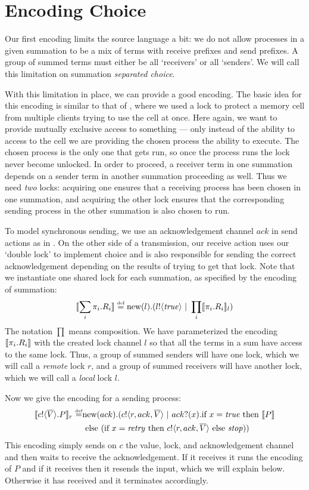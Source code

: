 \section{Encoding Choice}\label{failedencoding}
Our first encoding limits the source language a bit: we do not allow processes in a given summation to be a mix of terms with receive prefixes and send prefixes.  
A group of summed terms must either be all `receivers' or all `senders'.  
We will call this limitation on summation \emph{separated choice}.

With this limitation in place, we can provide a good encoding.  
The basic idea for this encoding is similar to that of , where we used a lock to protect a memory cell from multiple clients trying to use the cell at once.  
Here again, we want to provide mutually exclusive access to something --- only instead of the ability to access to the cell we are providing the chosen process the ability to execute.  
The chosen process is the only one that gets run, so once the process runs the lock never become unlocked.  
In order to proceed, a receiver term in one summation depends on a sender term in another summation proceeding as well.
Thus we need \emph{two} locks: acquiring one ensures that a receiving process has been chosen in one summation, and acquiring the other lock ensures that the corresponding sending process in the other summation is also chosen to run.

To model synchronous sending, we use an acknowledgement channel $ack$ in send actions as in .  On the other side of a transmission, our receive action uses our `double lock' to implement choice and is also responsible for sending the correct acknowledgement depending on the results of trying to get that lock.  Note that we instantiate one shared lock for each summation, as specified by the encoding of summation:
\[
	\llbracket{\displaystyle\sum_{i} \pi_i.R_i}\rrbracket \overset{\mbox{\tiny{def}}}{=} \text{new}({l}).({l}!\langle{ \ensuremath{\text{\emph{true}}} }\rangle \ |\  \displaystyle\prod_{i}\llbracket{\pi_i.R_i}\rrbracket_l)
\]
The notation $\prod$ means composition.  We have parameterized the encoding $\llbracket{\pi_i.R_i}\rrbracket$ with the created lock channel $l$ so that all the terms in a sum have access to the same lock.  Thus, a group of summed senders will have one lock, which we will call a \emph{remote} lock $r$, and a group of summed receivers will have another lock, which we will call a \emph{local} lock $l$.

Now we give the encoding for a sending process:
\begin{equation*}\begin{split}
	\llbracket{ \ensuremath{{c}!\langle{ \ensuremath{\overline{V}} }\rangle.} P}\rrbracket_r \overset{\mbox{\tiny{def}}}{=} & \text{new}({ack}).({c}!\langle{r,ack, \ensuremath{\overline{V}} }\rangle \ |\  {ack}?({x}). \text{if } {x= \ensuremath{\text{\emph{true}}} } \text{ then } \llbracket{P}\rrbracket \\
	&\text{ else } (\text{if } {x= \ensuremath{\text{\emph{retry}}} } \text{ then } {c}!\langle{r,ack, \ensuremath{\overline{V}} }\rangle \text{ else } \mbox{\emph{stop}}))
\end{split}\end{equation*}
This encoding simply sends on $c$ the value, lock, and acknowledgement channel and then waits to receive the acknowledgement.  
If it receives \ptrue it runs the encoding of $P$ and if it receives \pretry then it resends the input, which we will explain below.  Otherwise it has received \pfalse and it terminates accordingly.


